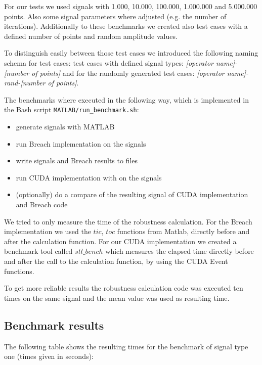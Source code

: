 \documentclass[a4paper,10pt]{article}
\begin{document}
For our tests we used signals with 1.000, 10.000, 100.000, 1.000.000 and 5.000.000 points. Also some signal parameters where adjusted (e.g. the number of iterations). 
Additionally to these benchmarks we created also test cases with a defined number of points and random amplitude values. 

To distinguish easily between those test cases we introduced the following naming schema for test cases: test cases with defined signal types: \emph{[operator name]-[number of points]} and for the randomly generated test cases: \emph{[operator name]-rand-[number of points]}.

The benchmarks where executed in the following way, which is implemented in the Bash script \verb|MATLAB/run_benchmark.sh|:
\begin{itemize}
	\item generate signals with MATLAB 
	\item run Breach implementation on the signals
	\item write signals and Breach results to files
	\item run CUDA implementation with on the signals
	\item (optionally) do a compare of the resulting signal of CUDA implementation and Breach code
\end{itemize}

We tried to only measure the time of the robustness calculation. For the Breach implementation we used the $tic$, $toc$ functions from Matlab, directly before and after the calculation function. For our CUDA implementation we created a benchmark tool called $stl\_bench$ which measures the elapsed time directly before and after the call to the calculation function, by using the CUDA Event functions.

To get more reliable results the robustness calculation code was executed ten times on the same signal and the mean value was used as resulting time.


\subsection{Benchmark results}

The following table shows the resulting times for the benchmark of signal type one (times given in seconds):
\end{document}
